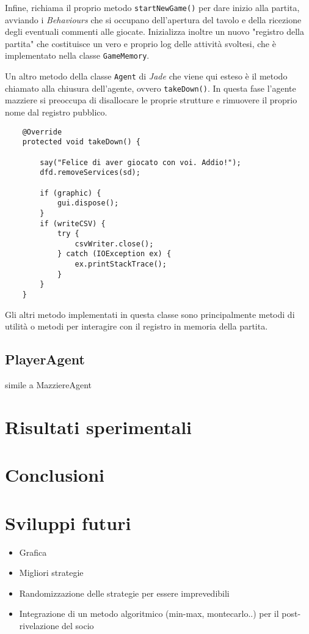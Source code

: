 \documentclass[runningheads,a4paper]{llncs}
\begin{document}
Infine, richiama il proprio metodo \texttt{startNewGame()} per dare inizio alla partita, avviando i \emph{Behaviours} che si occupano dell'apertura del tavolo e della ricezione degli eventuali commenti alle giocate.
Inizializza inoltre un nuovo "registro della partita" che costituisce un vero e proprio log delle attività svoltesi, che è implementato nella classe \texttt{GameMemory}.



Un altro metodo della classe \texttt{Agent} di \emph{Jade} che viene qui esteso è il metodo chiamato alla chiusura dell'agente, ovvero \texttt{takeDown()}.
In questa fase l'agente mazziere si preoccupa di disallocare le proprie strutture e rimuovere il proprio nome dal registro pubblico.
\begin{verbatim}
    @Override
    protected void takeDown() {

        say("Felice di aver giocato con voi. Addio!");
        dfd.removeServices(sd);

        if (graphic) {
            gui.dispose();
        }
        if (writeCSV) {
            try {
                csvWriter.close();
            } catch (IOException ex) {
                ex.printStackTrace();
            }
        }
    }
\end{verbatim}

Gli altri metodo implementati in questa classe sono principalmente metodi di utilità o metodi per interagire con il registro in memoria della partita.


\subsection{PlayerAgent}

simile a MazziereAgent





\section{Risultati sperimentali}

\section{Conclusioni}


\section{Sviluppi futuri}
\begin{itemize}
   \item Grafica
   \item Migliori strategie
   \item Randomizzazione delle strategie per essere imprevedibili
   \item Integrazione di un metodo algoritmico (min-max, montecarlo..) per il post-rivelazione del socio
\end{itemize}
\end{document}
